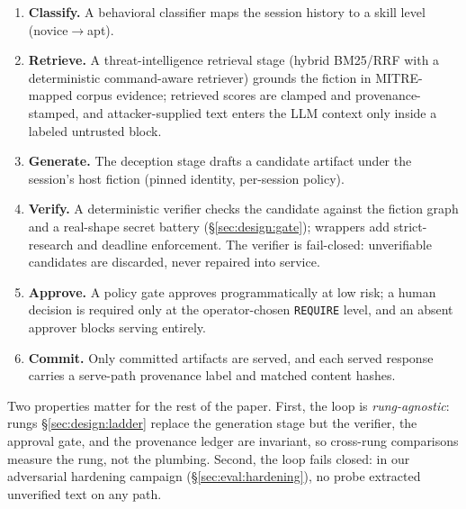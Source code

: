 \begin{enumerate}
  \item \textbf{Classify.} A behavioral classifier maps the session history to
  a skill level (novice$\to$apt).
  \item \textbf{Retrieve.} A threat-intelligence retrieval stage (hybrid
  BM25/RRF with a deterministic command-aware retriever) grounds the fiction
  in MITRE-mapped corpus evidence; retrieved scores are clamped and
  provenance-stamped, and attacker-supplied text enters the LLM context only
  inside a labeled untrusted block.
  \item \textbf{Generate.} The deception stage drafts a candidate artifact
  under the session's host fiction (pinned identity, per-session policy).
  \item \textbf{Verify.} A deterministic verifier checks the candidate against
  the fiction graph and a real-shape secret battery
  (\S\ref{sec:design:gate}); wrappers add strict-research and deadline
  enforcement. The verifier is fail-closed: unverifiable candidates are
  discarded, never repaired into service.
  \item \textbf{Approve.} A policy gate approves programmatically at low risk;
  a human decision is required only at the operator-chosen
  \texttt{REQUIRE} level, and an absent approver blocks serving entirely.
  \item \textbf{Commit.} Only committed artifacts are served, and each served
  response carries a serve-path provenance label and matched content hashes.
\end{enumerate}

Two properties matter for the rest of the paper. First, the loop is
\emph{rung-agnostic}: rungs \S\ref{sec:design:ladder} replace the generation
stage but the verifier, the approval gate, and the provenance ledger are
invariant, so cross-rung comparisons measure the rung, not the plumbing.
Second, the loop fails closed: in our adversarial hardening campaign
(\S\ref{sec:eval:hardening}), no probe extracted unverified text on any path.

